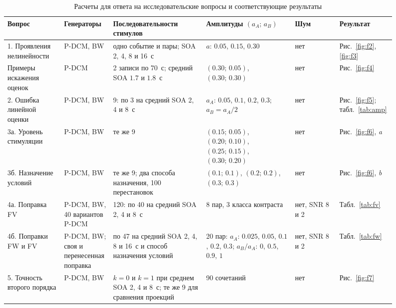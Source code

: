 \begin{table}[!ht]
\caption{Расчеты для ответа на исследовательские вопросы и соответствующие результаты}
\label{tab:series}
\centering
\footnotesize
\setlength{\tabcolsep}{4pt}
\newcommand*{\rr}{\raggedright}
\begin{tabular}{@{}p{0.14\linewidth}p{0.12\linewidth}p{0.23\linewidth}p{0.22\linewidth}p{0.11\linewidth}p{0.09\linewidth}@{}}
\hline
\rr Вопрос & \rr Генераторы & \rr Последовательности стимулов & \rr Амплитуды $(a_A;\,a_B)$ & \rr Шум & \rr Результат\tabularnewline
\hline
\rr 1. Проявления нелинейности & \rr P-DCM, BW & \rr одно событие и пары; SOA 2, 4, 8 и 16~с & \rr $a$: $0.05$, $0.15$, $0.30$ & \rr нет & \rr Рис.~\ref{fig:f2}, \ref{fig:f3}\tabularnewline[3pt]
\rr Примеры искажения оценок & \rr P-DCM & \rr 2 записи по 70~с; средний SOA $1.7$ и $1.8$~с & \rr $(0.30;\,0.05)$, $(0.30;\,0.30)$ & \rr нет & \rr Рис.~\ref{fig:f4}\tabularnewline[3pt]
\rr 2. Ошибка линейной оценки & \rr P-DCM, BW & \rr 9: по 3 на средний SOA 2, 4 и 8~с & \rr $a_A$: $0.05$, $0.1$, $0.2$, $0.3$; $a_B=a_A/2$ & \rr нет & \rr Рис.~\ref{fig:f5}; табл.~\ref{tab:amp}\tabularnewline[3pt]
\rr 3а. Уровень стимуляции & \rr P-DCM, BW & \rr те же 9 & \rr $(0.15;\,0.05)$, $(0.20;\,0.10)$, $(0.25;\,0.15)$, $(0.30;\,0.20)$ & \rr нет & \rr Рис.~\ref{fig:f6}, \textit{a}\tabularnewline[3pt]
\rr 3б. Назначение условий & \rr P-DCM, BW & \rr те же 9; два способа назначения, 100 перестановок & \rr $(0.1;\,0.1)$, $(0.2;\,0.2)$, $(0.3;\,0.3)$ & \rr нет & \rr Рис.~\ref{fig:f6}, \textit{b}\tabularnewline[3pt]
\rr 4а. Поправка FV & \rr P-DCM, BW, 40 вариантов P-DCM & \rr 120: по 40 на средний SOA 2, 4 и 8~с & \rr 8 пар, 3 класса контраста & \rr нет, SNR 8 и 2 & \rr Табл.~\ref{tab:fv}\tabularnewline[3pt]
\rr 4б. Поправки FW и FV & \rr P-DCM, BW; своя и перенесенная поправка & \rr по 47 на средний SOA 2, 4, 8 и 16~с и способ назначения условий & \rr 20 пар: $a_A$: $0.025$, $0.05$, $0.1$, $0.2$, $0.3$; $a_B/a_A$: $0$, $0.5$, $0.9$, $1$ & \rr нет, SNR 8 и 2 & \rr Табл.~\ref{tab:fw}\tabularnewline[3pt]
\rr 5. Точность второго порядка & \rr P-DCM, BW & \rr $k=0$ и $k=1$ при среднем SOA 2, 4 и 8~с; те же 9 для сравнения проекций & \rr 90 сочетаний & \rr нет & \rr Рис.~\ref{fig:f7}\tabularnewline
\hline
\end{tabular}
\end{table}

